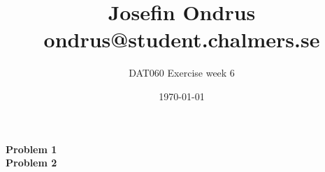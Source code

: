 \documentclass[12pt,oneside,reqno]{amsart}
\begin{document}
\setlength{\parindent}{6pt}
\def\code#1{\texttt{#1}} %
\def\ra{\rightarrow{}} %
\newcommand{\itab}[1]{\hspace{0em}\rlap{#1}}
\newcommand{\tab}[1]{\hspace{.2\textwidth}\rlap{#1}}
\newcommand\deff{\mathrel{\stackrel{\makebox[0pt]{\mbox{\normalfont\tiny def}}}{=}}}
\raggedbottom

\title{Josefin Ondrus\\ondrus@student.chalmers.se}
\author{DAT060 Exercise week 6}
\date{\today}
\maketitle

\textbf{Problem 1}\\

\textbf{Problem 2}\\
\end{document}

